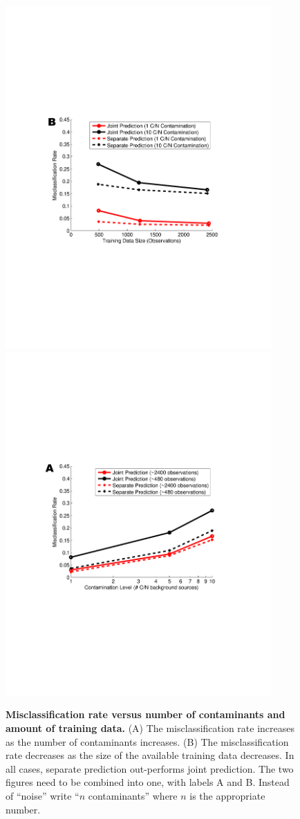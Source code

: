 \documentclass[12pt]{article}
\begin{document}
\clearpage
\begin{figure}[!ht]
\centerline{\includegraphics[width=4in]{Figures/VaryingNoiseNEW.pdf}\includegraphics[width=4in]{Figures/VaryingDataNEW.pdf}}
\caption{\label{fig:misclassification}\textbf{Misclassification rate versus number of contaminants and amount of training data.} (A) The misclassification rate increases as the number of contaminants increases. (B) The misclassification rate decreases as the size of the available training data decreases. In all cases, separate prediction out-performs joint prediction. {\color{red}The two figures need to be combined into one, with labels A and B. Instead of ``noise'' write ``$n$ contaminants'' where $n$ is the appropriate number.} }
\end{figure}
\end{document}
